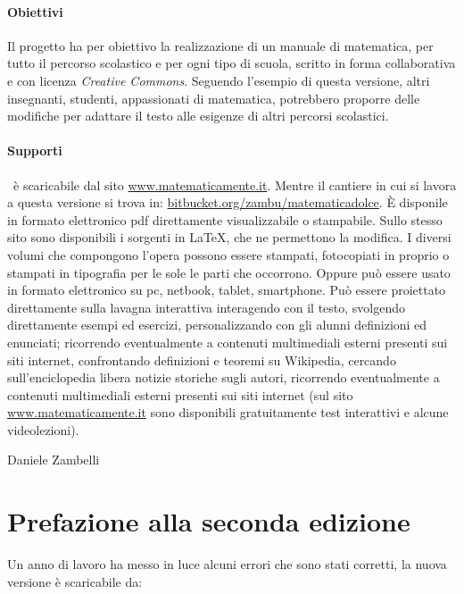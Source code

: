 \paragraph{Obiettivi} Il progetto \emph{\serie} ha per obiettivo la
realizzazione di un manuale di matematica, per tutto il percorso scolastico
e per ogni tipo di scuola, scritto in forma collaborativa e con licenza
\textit{Creative Commons}.
Seguendo l'esempio di questa versione, altri insegnanti, studenti,
appassionati di matematica, potrebbero proporre delle modifiche per adattare
il testo alle esigenze di altri percorsi scolastici.

\paragraph{Supporti}
\serie\ è scaricabile dal sito \url{www.matematicamente.it}.
Mentre il cantiere in cui si lavora a questa versione si trova in:
\url{bitbucket.org/zambu/matematicadolce}.
È disponile in formato elettronico pdf direttamente visualizzabile o
stampabile.
Sullo stesso sito sono disponibili i sorgenti in {\LaTeX},
che ne permettono la modifica.
I diversi volumi che compongono l'opera possono essere stampati,
fotocopiati in proprio o stampati in tipografia per le sole le parti che
occorrono.
Oppure può essere usato in formato elettronico su pc, netbook, tablet,
smartphone.
Può essere proiettato direttamente sulla lavagna interattiva
interagendo con il testo, svolgendo direttamente esempi ed esercizi,
personalizzando con gli alunni definizioni ed enunciati;
ricorrendo eventualmente a contenuti multimediali esterni presenti
sui siti internet, confrontando definizioni e teoremi su Wikipedia,
cercando sull'enciclopedia libera notizie storiche sugli autori,
ricorrendo eventualmente a contenuti multimediali esterni presenti sui siti
internet (sul sito \url{www.matematicamente.it} sono disponibili
gratuitamente test interattivi e alcune videolezioni).

\begin{flushright}
Daniele Zambelli
\end{flushright}

\newpage

\section{Prefazione alla seconda edizione}

Un anno di lavoro ha messo in luce alcuni errori che sono stati corretti,
la nuova versione è scaricabile da:

